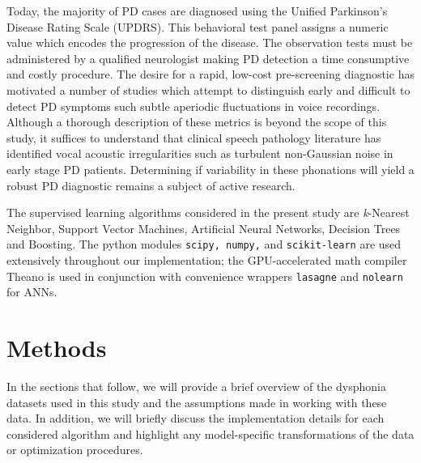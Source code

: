 \documentclass[12pt]{article}
\begin{document}
Today, the majority of PD cases are diagnosed using the Unified Parkinson's Disease Rating Scale (UPDRS). This behavioral test panel assigns a numeric value which encodes the progression of the disease. The observation tests must be administered by a qualified neurologist making PD detection a time consumptive and costly procedure. The desire for a rapid, low-cost pre-screening diagnostic has motivated a number of studies which attempt to distinguish early and difficult to detect PD symptoms such subtle aperiodic fluctuations in voice recordings. Although a thorough description of these metrics is beyond the scope of this study, it suffices to understand that clinical speech pathology literature has identified vocal acoustic irregularities such as turbulent non-Gaussian noise in early stage PD patients. Determining if variability in these phonations will yield a robust PD diagnostic remains a subject of active research.

The supervised learning algorithms considered in the present study are \textit{k}-Nearest Neighbor, Support Vector Machines, Artificial Neural Networks, Decision Trees and Boosting. The python modules \texttt{scipy, numpy,} and \texttt{scikit-learn} \cite{scipy} \cite{scikit-learn} are used extensively  throughout our implementation; the GPU-accelerated math compiler Theano \cite{bergstra+al:2010-scipy} is used in conjunction with convenience wrappers \texttt{lasagne} and \texttt{nolearn} for ANNs.

\section{Methods}
\label{sec:meth}
In the sections that follow, we will provide a brief overview of the dysphonia datasets used in this study and the assumptions made in working with these data. In addition, we will briefly discuss the implementation details for each considered algorithm and highlight any model-specific transformations of the data or optimization procedures.
\end{document}
